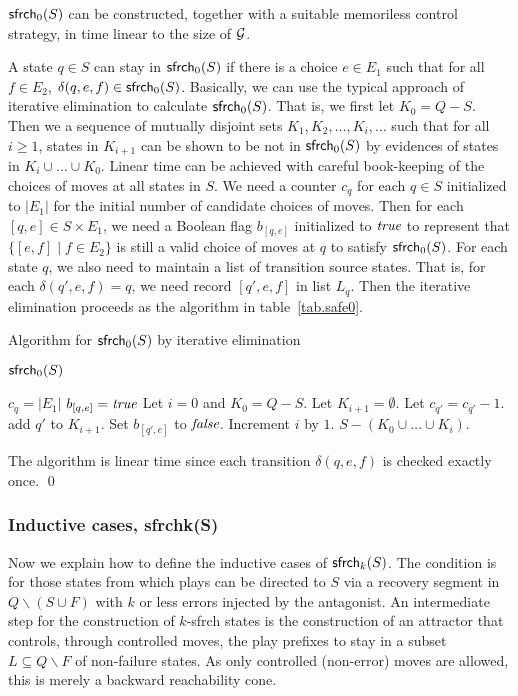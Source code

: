 \begin{lemma}
\label{lem:NLSafe0}
$\mathsf{sfrch}_0(S)$ can be constructed, together with a suitable memoriless
control strategy, in time linear to the size of ${\cal G}$.
\end{lemma}
\pf 
A state $q\in S$ can stay in $\mathsf{sfrch}_0(S)$ if there is a choice $e\in E_1$ 
such that for all $f\in E_2$, $\delta(q,e,f)\in \mathsf{sfrch}_0(S)$.  
Basically, we can use the typical approach of iterative elimination 
to calculate $\mathsf{sfrch}_0(S)$. 
That is, we first let $K_0=Q-S$.  
Then we a sequence of mutually disjoint sets 
$K_1,K_2,\ldots,K_i,\ldots$ such that 
for all $i\geq 1$, states in $K_{i+1}$ can be shown to be not 
in $\mathsf{sfrch}_0(S)$ by evidences of states in $K_i\cup \ldots\cup K_0$.    
Linear time can be achieved with careful book-keeping of the choices of 
moves at all states in $S$. 
We need a counter $c_q$ for each $q\in S$ initialized to 
$|E_1|$ for the initial number of candidate choices of moves. 
Then for each $[q,e]\in S\times E_1$, we need a Boolean flag $b_{[q,e]}$ 
initialized to $\mbox{\em true}$ to represent that 
$\{[e,f]\mid f\in E_2\}$ is still a valid choice of moves at $q$ to 
satisfy $\mathsf{sfrch}_0(S)$. 
For each state $q$, we also need to maintain a list of transition source states. 
That is, for each $\delta(q',e,f)=q$, we need 
record $[q',e,f]$ in list $L_q$.  
Then the iterative elimination proceeds as the algorithm in 
table~\ref{tab.safe0}.  
\begin{table}[!t]
\caption{Algorithm for $\mathsf{sfrch}_0(S)$ by iterative elimination} 
\label{tab.safe0}
\procbegin \noindent 
$\mathsf{sfrch}_0(S)$  
\begin{algorithmic}[1]
 $c_q=|E_1|$ \ENDFORLINE 
{} $b_{[q,e]}=\mbox{\em true}$ \ENDFORLINE 
\STATE Let $i=0$ and $K_0=Q-S$. 
  \STATE Let $K_{i+1}=\emptyset$. 
      \STATE Let $c_{q'}=c_{q'}-1$. 
       add $q'$ to $K_{i+1}$.  \ENDIFLINE  
    \ENDIF 
    \STATE Set $b_{[q',e]}$ to $\mbox{\em false}$. 
  \ENDFOR
  \STATE Increment $i$ by $1$.  
\ENDWHILE 
\RETURN $S-(K_0\cup \ldots \cup K_i)$.  
\end{algorithmic}
\procend 
\end{table} 
The algorithm is linear time since each transition $\delta(q,e,f)$ is 
checked exactly once. 
\qed
\subsubsection{Inductive cases, sfrchk(S)}
Now we explain how to define the inductive cases of $\mathsf{sfrch}_k(S)$. 
The condition is for those states from which plays can be directed to 
$S$ via a recovery segment in $Q\smallsetminus (S\cup F)$ 
with $k$ or less errors injected by the antagonist. 
An intermediate step for the construction of $k$-sfrch states is the construction 
of an attractor\label{reply2.attractor} that controls, through controlled moves, 
the play prefixes to stay in a 
subset $L\subseteq Q\smallsetminus F$ of non-failure states. 
As only controlled (non-error) moves are allowed, 
this is merely a backward reachability cone.

